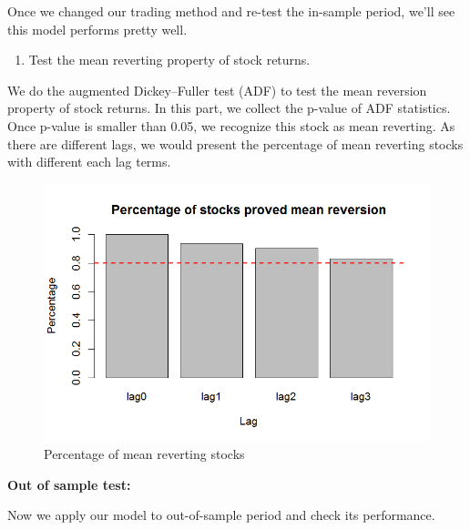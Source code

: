 \documentclass[]{article}
\providecommand{\tightlist}{%
  \setlength{\itemsep}{0pt}\setlength{\parskip}{0pt}}
\begin{document}
Once we changed our trading method and re-test the in-sample period,
we'll see this model performs pretty well.

\begin{enumerate}
\def\labelenumi{\arabic{enumi}.}
\setcounter{enumi}{1}
\tightlist
\item
  Test the mean reverting property of stock returns.
\end{enumerate}

We do the augmented Dickey--Fuller test (ADF) to test the mean reversion
property of stock returns. In this part, we collect the p-value of ADF
statistics. Once p-value is smaller than 0.05, we recognize this stock
as mean reverting. As there are different lags, we would present the
percentage of mean reverting stocks with different each lag terms.

\begin{figure}[H]
\begin{center}
\includegraphics[width=5in]{Lab//mean_rev_pctg.jpg}
\caption{Percentage of mean reverting stocks}
\label{figure10}
\end{center}
\end{figure}

\textbf{Out of sample test:}

Now we apply our model to out-of-sample period and check its
performance.
\end{document}
